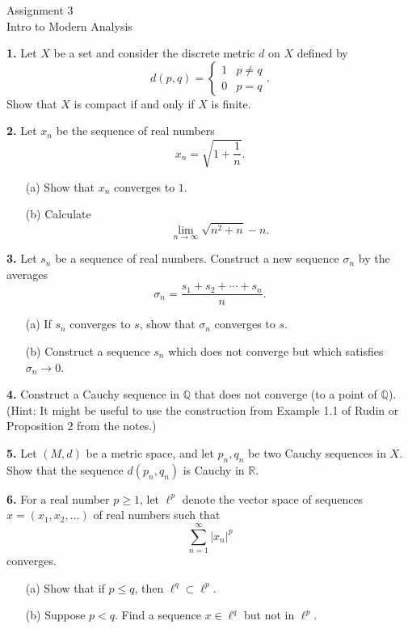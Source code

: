 \documentclass[12pt]{article}
\begin{document}
\begin{center}
Assignment 3\\
Intro to Modern Analysis
\end{center}

\noindent \textbf{1.} Let $X$ be a set and consider the discrete metric $d$ on $X$ defined by  
\[
d(p,q) = \begin{cases}
1 & p \neq q \\
0 & p = q
\end{cases}.
\]
Show that $X$ is compact if and only if $X$ is finite. 

\medskip 

\noindent \textbf{2.} Let $x_n$ be the sequence of real numbers 
\[
x_n = \sqrt{1 + \frac{1}{n}}.
\]
\begin{enumerate}
\item[(a)] Show that $x_n$ converges to $1$. 
\item[(b)] Calculate 
\[
\lim_{n \to \infty} \sqrt{n^2 + n} - n.
\]
\end{enumerate}

\noindent \textbf{3.} Let $s_n$ be a sequence of real numbers. Construct a new sequence $\sigma_n$ by the averages 
\[
\sigma_n = \frac{s_1 + s_2 + \cdots + s_n}{n}.
\]
\begin{enumerate}
\item[(a)] If $s_n$ converges to $s$, show that $\sigma_n$ converges to $s$. 
\item[(b)] Construct a sequence $s_n$ which does not converge but which satisfies $\sigma_n \to 0$. 
\end{enumerate}

\medskip

\noindent \textbf{4.} Construct a Cauchy sequence in $\mathbb{Q}$ that does not converge (to a point of $\mathbb{Q}$). (Hint: It might be useful to use the construction from Example 1.1 of Rudin or Proposition 2 from the notes.)

\medskip

\noindent \textbf{5.} Let $(M,d)$ be a metric space, and let $p_n, q_n$ be two Cauchy sequences in $X$. Show that the sequence $d(p_n, q_n)$ is Cauchy in $\mathbb{R}$. 

\medskip 


\noindent \textbf{6.} For a real number $p \geqslant 1$, let $\ell^p$ denote the vector space of sequences $x = (x_1, x_2, \ldots)$ of real numbers such that  
\[
\sum_{n=1}^\infty |x_n|^p 
\]
converges. 
\begin{enumerate}
\item[(a)] Show that if $p \leqslant q$, then $\ell^q \subset \ell^p$. 
\item[(b)] Suppose $p < q$. Find a sequence $x \in \ell^q$ but not in $\ell^p$. 
\end{enumerate}
\end{document}
